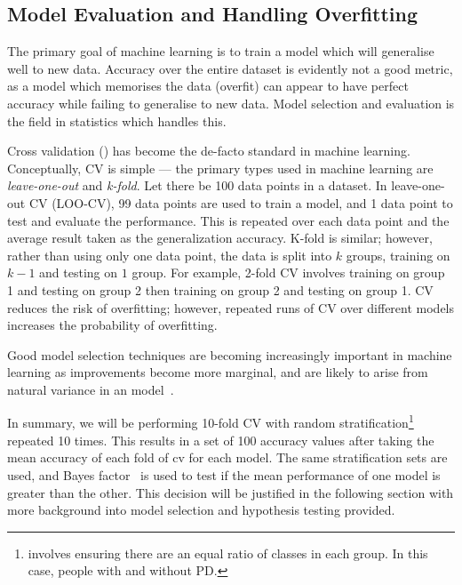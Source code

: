 \documentclass[12pt, twoside]{book}
\renewcommand\emph[1]{\textit{\color{USred}{#1}}}
\begin{document}
\subsection{Model Evaluation and Handling Overfitting}
\label{detectoverfit}
The primary goal of machine learning is to train a model which will generalise well to new data. Accuracy over the entire dataset is evidently not a good metric, as a model which memorises the data (overfit) can appear to have perfect accuracy while failing to generalise to new data. Model selection and evaluation is the field in statistics which handles this. 

Cross validation (\emph{CV}) has become the de-facto standard in machine learning. Conceptually, CV is simple --- the primary types used in machine learning are \textit{leave-one-out} and \textit{k-fold}. Let there be 100 data points in a dataset. In leave-one-out CV (LOO-CV), 99 data points are used to train a model, and 1 data point to test and evaluate the performance. This is repeated over each  data point and the average result taken as the generalization accuracy. K-fold is similar; however, rather than using only one data point, the data is split into $k$ groups, training on $k-1$ and testing on $1$ group. For example, 2-fold CV involves training on group 1 and testing on group 2 then training on group 2 and testing on group 1. CV reduces the risk of overfitting; however, repeated runs of CV over different models increases the probability of overfitting.



\begin{highlight}
	Good model selection techniques are becoming increasingly important in machine learning as improvements become more marginal, and are likely to arise from natural variance in an model~\cite{overfittingcv}.
\end{highlight} 



In summary, we will be performing 10-fold CV with random stratification\footnote{\emph{Stratification} involves ensuring there are an equal ratio of classes in each group. In this case, people with and without PD. } repeated 10 times. This results in a set of 100 accuracy values after taking the mean accuracy of each fold of cv for each model. The same stratification sets are used, and Bayes factor~\cite{bayesianttests} is used to test if the mean performance of one model is greater than the other. This decision will be justified in the following section with more background into model selection and hypothesis testing provided.
\end{document}
